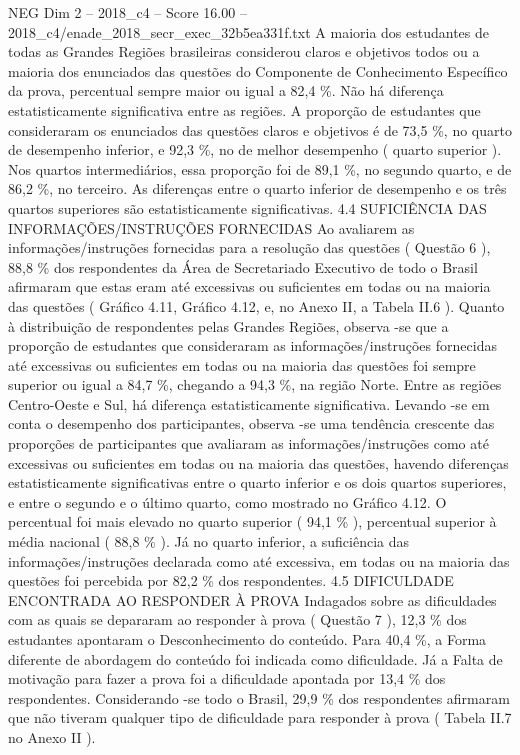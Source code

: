 \begin{textsample}{NEG Dim 2 – 2018\_c4 – Score 16.00 – 2018\_c4/enade\_2018\_secr\_exec\_32b5ea331f.txt}
A maioria dos estudantes de todas as Grandes Regiões brasileiras considerou claros e objetivos todos ou a maioria dos enunciados das questões do Componente de Conhecimento Específico da prova, percentual sempre maior ou igual a 82,4 \%.
Não há diferença estatisticamente significativa entre as regiões.
A proporção de estudantes que consideraram os enunciados das questões claros e objetivos é de 73,5 \%, no quarto de desempenho inferior, e 92,3 \%, no de melhor desempenho ( quarto superior ).
Nos quartos intermediários, essa proporção foi de 89,1 \%, no segundo quarto, e de 86,2 \%, no terceiro.
As diferenças entre o quarto inferior de desempenho e os três quartos superiores são estatisticamente significativas. 4.4 SUFICIÊNCIA DAS INFORMAÇÕES/INSTRUÇÕES FORNECIDAS Ao avaliarem as informações/instruções fornecidas para a resolução das questões ( Questão 6 ), 88,8 \% dos respondentes da Área de Secretariado Executivo de todo o Brasil afirmaram que estas eram até excessivas ou suficientes em todas ou na maioria das questões ( Gráfico 4.11, Gráfico 4.12, e, no Anexo II, a Tabela II.6 ).
Quanto à distribuição de respondentes pelas Grandes Regiões, observa -se que a proporção de estudantes que consideraram as informações/instruções fornecidas até excessivas ou suficientes em todas ou na maioria das questões foi sempre superior ou igual a 84,7 \%, chegando a 94,3 \%, na região Norte.
Entre as regiões Centro-Oeste e Sul, há diferença estatisticamente significativa.
Levando -se em conta o desempenho dos participantes, observa -se uma tendência crescente das proporções de participantes que avaliaram as informações/instruções como até excessivas ou suficientes em todas ou na maioria das questões, havendo diferenças estatisticamente significativas entre o quarto inferior e os dois quartos superiores, e entre o segundo e o último quarto, como mostrado no Gráfico 4.12.
O percentual foi mais elevado no quarto superior ( 94,1 \% ), percentual superior à média nacional ( 88,8 \% ).
Já no quarto inferior, a suficiência das informações/instruções declarada como até excessiva, em todas ou na maioria das questões foi percebida por 82,2 \% dos respondentes. 4.5 DIFICULDADE ENCONTRADA AO RESPONDER À PROVA Indagados sobre as dificuldades com as quais se depararam ao responder à prova ( Questão 7 ), 12,3 \% dos estudantes apontaram o Desconhecimento do conteúdo.
Para 40,4 \%, a Forma diferente de abordagem do conteúdo foi indicada como dificuldade.
Já a Falta de motivação para fazer a prova foi a dificuldade apontada por 13,4 \% dos respondentes.
Considerando -se todo o Brasil, 29,9 \% dos respondentes afirmaram que não tiveram qualquer tipo de dificuldade para responder à prova ( Tabela II.7 no Anexo II ).

\end{textsample}

